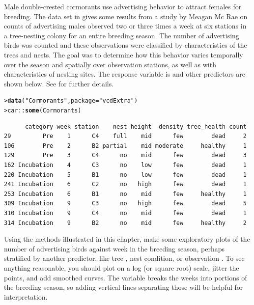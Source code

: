 \documentclass[10pt]{report}\usepackage[]{graphicx}\usepackage[]{color}
\makeatletter
\newcommand{\hlstr}[1]{\textcolor[rgb]{0.192,0.494,0.8}{#1}}%
\newcommand{\hlopt}[1]{\textcolor[rgb]{0,0,0}{#1}}%
\newcommand{\hlstd}[1]{\textcolor[rgb]{0.345,0.345,0.345}{#1}}%
\newcommand{\hlkwc}[1]{\textcolor[rgb]{0.333,0.667,0.333}{#1}}%
\newcommand{\hlkwd}[1]{\textcolor[rgb]{0.737,0.353,0.396}{\textbf{#1}}}%
\newenvironment{kframe}{%
 \def\at@end@of@kframe{}%
 \ifinner\ifhmode%
  \def\at@end@of@kframe{\end{minipage}}%
  \begin{minipage}{\columnwidth}%
 \fi\fi%
 \def\FrameCommand##1{\hskip\@totalleftmargin \hskip-\fboxsep
 \colorbox{shadecolor}{##1}\hskip-\fboxsep
     \hskip-\linewidth \hskip-\@totalleftmargin \hskip\columnwidth}%
 \MakeFramed {\advance\hsize-\width
   \@totalleftmargin\z@ \linewidth\hsize
   \@setminipage}}%
 {\par\unskip\endMakeFramed%
 \at@end@of@kframe}
\newenvironment{knitrout}{}{} %
\renewenvironment{knitrout}{\small\renewcommand{\baselinestretch}{.85}}{} %
\makeatother
\begin{document}
\begin{Exercises}
  \exercise Male double-crested cormorants use advertising behavior to attract females for breeding.
	The  data set in  gives some results from a study by
	Meagan Mc Rae \citeyearpar{McRae:2015} on counts of advertising males observed two or three times a week
	at six stations in a tree-nesting colony for an entire breeding season.
	The number of advertising birds was counted and these observations were classified
	by characteristics of the trees and nests. The goal was to determine how this behavior varies 
	temporally over the season and spatially over observation stations, as well as with 
	characteristics of nesting sites.
	The response variable is 
	and other predictors are shown below.  See 
	for further details.
\begin{knitrout}\footnotesize
{}\color{fgcolor}\begin{kframe}
\begin{alltt}
\hlstd{> }\hlkwd{data}\hlstd{(}\hlstr{"Cormorants"}\hlstd{,} \hlkwc{package} \hlstd{=} \hlstr{"vcdExtra"}\hlstd{)}
\hlstd{> }\hlstd{car}\hlopt{::}\hlkwd{some}\hlstd{(Cormorants)}
\end{alltt}
\begin{verbatim}
      category week station    nest height  density tree_health count
29         Pre    1      C4    full    mid      few        dead     2
106        Pre    2      B2 partial    mid moderate     healthy     1
129        Pre    3      C4      no    mid      few        dead     3
162 Incubation    4      C3      no    low      few        dead     1
220 Incubation    5      B1      no    low      few        dead     1
241 Incubation    6      C2      no   high      few        dead     1
253 Incubation    6      B1      no    mid      few     healthy     1
309 Incubation    9      C3      no   high      few        dead     5
310 Incubation    9      C4      no    mid      few        dead     1
314 Incubation    9      B2      no    mid      few     healthy     2
\end{verbatim}
\end{kframe}
\end{knitrout}
	\begin{enumerate*}
		\item Using the methods illustrated in this chapter, make some exploratory plots of the
		number of advertising birds against week in the breeding season, perhaps stratified
		by another predictor, like tree , nest condition, or observation
		. 
		To see anything reasonable,
		you should plot  on a log (or square root) scale, jitter the points, and add
		smoothed curves. The variable  breaks the weeks into portions of the
		breeding season, so adding vertical lines separating those will be helpful for interpretation.
		\begin{ans}
		\end{ans}
		

\end{enumerate*}
\end{Exercises}
\end{document}
